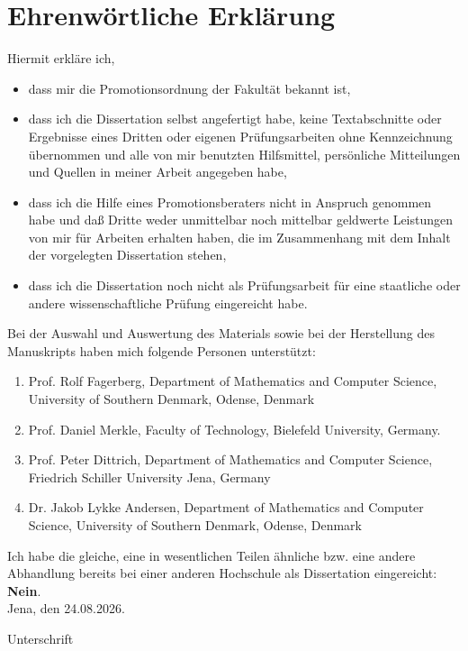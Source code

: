 \chapter{Ehrenwörtliche Erklärung}

Hiermit erkläre ich,
\begin{itemize}
	\item dass mir die Promotionsordnung der Fakultät bekannt ist,
	\item dass ich die Dissertation selbst angefertigt habe, keine Textabschnitte oder Ergebnisse eines Dritten oder eigenen Prüfungsarbeiten ohne Kennzeichnung übernommen und alle von mir benutzten Hilfsmittel, persönliche Mitteilungen und Quellen in meiner Arbeit angegeben habe,
	\item dass ich die Hilfe eines Promotionsberaters nicht in Anspruch genommen habe und daß Dritte weder unmittelbar noch mittelbar geldwerte Leistungen von mir für Arbeiten erhalten haben, die im Zusammenhang mit dem Inhalt der vorgelegten Dissertation stehen,
	\item dass ich die Dissertation noch nicht als Prüfungsarbeit für eine staatliche oder andere wissenschaftliche Prüfung eingereicht habe.
\end{itemize}

Bei der Auswahl und Auswertung des Materials sowie bei der Herstellung des Manuskripts haben mich folgende Personen unterstützt: 
\begin{enumerate}
	\item Prof. Rolf Fagerberg, Department of Mathematics and Computer Science, University of Southern Denmark, Odense, Denmark
	\item Prof. Daniel Merkle, Faculty of Technology, Bielefeld University, Germany.
	\item Prof. Peter Dittrich, Department of Mathematics and Computer Science, Friedrich Schiller University Jena, Germany
	\item Dr. Jakob Lykke Andersen, Department of Mathematics and Computer Science, University of Southern Denmark, Odense, Denmark
\end{enumerate}

Ich habe die gleiche, eine in wesentlichen Teilen ähnliche bzw. eine andere Abhandlung bereits bei einer anderen Hochschule als Dissertation eingereicht: \textbf{Nein}.\\

Jena, den 24.08.2026.

\begin{flushright}
Unterschrift
\end{flushright}

